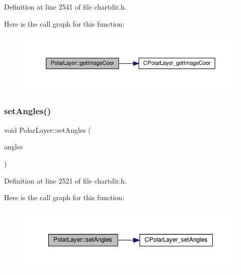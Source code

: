 Definition at line 2541 of file chartdir.\+h.

Here is the call graph for this function\+:
\nopagebreak
\begin{figure}[H]
\begin{center}
\leavevmode
\includegraphics[width=350pt]{class_polar_layer_a06d7ebff644bdcbae6381e8d37d5a5bf_cgraph}
\end{center}
\end{figure}
\mbox{\label{class_polar_layer_a3712e00d3aef0962d55ffc6e396ee0fe}} 
\subsubsection{\texorpdfstring{set\+Angles()}{setAngles()}}
{\footnotesize\ttfamily void Polar\+Layer\+::set\+Angles (\begin{DoxyParamCaption}\item[{\hyperlink{class_double_array}{Double\+Array}}]{angles }\end{DoxyParamCaption})\hspace{0.3cm}{\ttfamily [inline]}}



Definition at line 2521 of file chartdir.\+h.

Here is the call graph for this function\+:
\nopagebreak
\begin{figure}[H]
\begin{center}
\leavevmode
\includegraphics[width=348pt]{class_polar_layer_a3712e00d3aef0962d55ffc6e396ee0fe_cgraph}
\end{center}
\end{figure}
\mbox{\label{class_polar_layer_a4cb8110e5d28368088a1798d6dbc7c6c}} 
